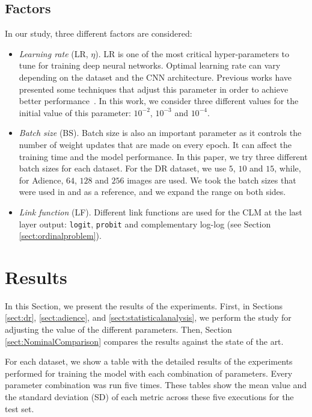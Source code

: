 \documentclass[preprint]{elsarticle}
\begin{document}
\subsection{Factors}
In our study, three different factors are considered:
\begin{itemize}
	\item \textit{Learning rate} (LR, $\eta$). LR is one of the most critical hyper-parameters to tune for training deep neural networks. Optimal learning rate can vary depending on the dataset and the CNN architecture. Previous works have presented some techniques that adjust this parameter in order to achieve better performance~\cite{smith2017cyclical,senior2013empirical}. In this work, we consider three different values for the initial value of this parameter: $10^{-2}$, $10^{-3}$ and $10^{-4}$.
	\item \textit{Batch size} (BS). Batch size is also an important parameter as it controls the number of weight updates that are made on every epoch. It can affect the training time and the model performance. In this paper, we try three different batch sizes for each dataset. For the DR dataset, we use $5$, $10$ and $15$, while, for Adience, $64$, $128$ and $256$ images are used. We took the batch sizes that were used in \cite{de2018weighted} and \cite{beckham2017unimodal} as a reference, and we expand the range on both sides.
	\item \textit{Link function} (LF). Different link functions are used for the CLM at the last layer output: \texttt{logit}, \texttt{probit} and complementary log-log (see Section \ref{sect:ordinalproblem}).
\end{itemize}

\section{Results}
\label{sect:results}
In this Section, we present the results of the experiments. First, in Sections \ref{sect:dr}, \ref{sect:adience}, and \ref{sect:statisticalanalysis}, we perform the study for adjusting the value of the different parameters. Then, Section \ref{sect:NominalComparison} compares the results against the state of the art.

For each dataset, we show a table with the detailed results of the experiments performed for training the model with each combination of parameters. Every parameter combination was run five times. These tables show the mean value and the standard deviation (SD) of each metric across these five executions for the test set.
\end{document}
